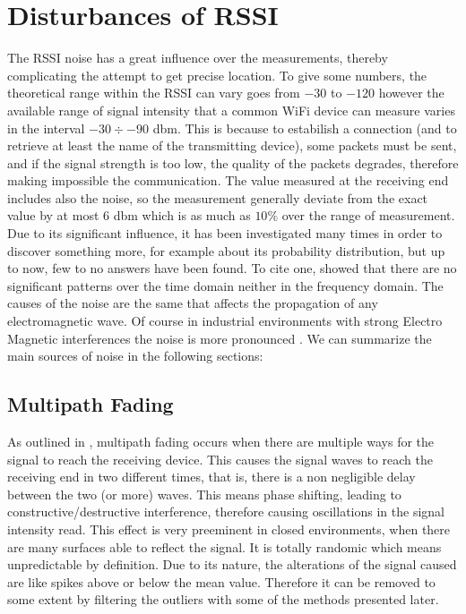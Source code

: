 \documentclass[12pt,twoside]{report}
\begin{document}
\chapter{Disturbances of RSSI}
The RSSI noise has a great influence over the measurements, thereby complicating the attempt to get precise location. To give some numbers, the theoretical range within the RSSI can vary goes from $-30$ to $-120$ however the available range of signal intensity that a common WiFi device can measure varies in the interval $-30\div-90$ dbm. This is because to estabilish a connection (and to retrieve at least the name of the transmitting device), some packets must be sent, and if the signal strength is too low, the quality of the packets degrades, therefore making impossible the communication. The value measured at the receiving end includes also the noise, so the measurement generally deviate from the exact value by at most $6$ dbm which is as much as $10\%$ over the range of measurement.
Due to its significant influence, it has been investigated many times in order to discover something more, for example about its probability distribution, but up to now, few to no answers have been found. To cite one, \cite{4608603} showed that there are no significant patterns over the time domain neither in the frequency domain. The causes of the noise are the same that affects the propagation of any electromagnetic wave. Of course in industrial environments with strong Electro Magnetic interferences the noise is more pronounced \cite{746e8399}. We can summarize the main sources of noise in the following sections: 
\section{Multipath Fading} 
As outlined in \cite{onl11}, multipath fading occurs when there are multiple ways for the signal to reach the receiving device. This causes the signal waves to reach the receiving end in two different times, that is, there is a non negligible delay between the two (or more) waves. This means phase shifting, leading to constructive/destructive interference, therefore causing oscillations in the signal intensity read. This effect is very preeminent in closed environments, when there are many surfaces able to reflect the signal. It is totally randomic \cite{10.5555/559977} which means unpredictable by definition. Due to its nature, the alterations of the signal caused are like spikes above or below the mean value. Therefore it can be removed to some extent by filtering the outliers with some of the methods presented later.
\end{document}

